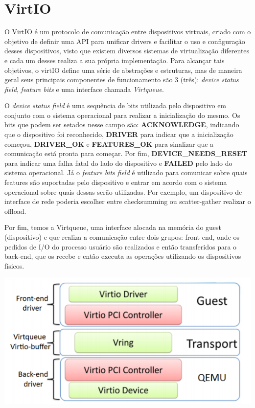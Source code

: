 \graphicspath{ {../img/} }

\section*{VirtIO}

O VirtIO é um protocolo de comunicação entre dispositivos virtuais, criado com o objetivo de definir uma API para unificar drivers e facilitar o uso e configuração desses dispositivos, 
visto que existem diversos sistemas de virtualização diferentes e cada um desses realiza a sua própria implementação.
Para alcançar tais objetivos, o virtIO define uma série de abstrações e estruturas, mas de maneira geral seus principais componentes de funcionamento são 3 (três): 
\emph{device status field}, \emph{feature bits} e uma interface chamada \emph{Virtqueue}.


O \emph{device status field} é uma sequência de bits utilizada pelo dispositivo em conjunto com o sistema operacional para realizar a inicialização do mesmo.
Os bits que podem ser setados nesse campo são: \textbf{ACKNOWLEDGE}, indicando que o dispositivo foi reconhecido, \textbf{DRIVER} para indicar que a inicialização começou, \textbf{DRIVER{\_}OK} e \textbf{FEATURES{\_}OK} para sinalizar que a comunicação está pronta para começar.
Por fim, \textbf{DEVICE{\_}NEEDS{\_}RESET} para indicar uma falha fatal do lado do dispositivo e \textbf{FAILED} pelo lado do sistema operacional.
Já o \emph{feature bits field} é utilizado para comunicar sobre quais features são suportadas pelo dispositivo e entrar em acordo com o sistema operacional sobre quais dessas serão utilizadas. Por exemplo, um dispositivo de interface de rede poderia escolher entre checksumming ou scatter-gather realizar o offload.

Por fim, temos a Virtqueue, uma interface alocada na memória do guest (dispositivo) e que realiza a comunicação entre dois grupos: front-end, onde os pedidos de I/O do processo usuário são realizados e então transferidos para o back-end, que os recebe e então executa as operações utilizando os dispositivos físicos. 

\includegraphics{virtio-arch.png}

